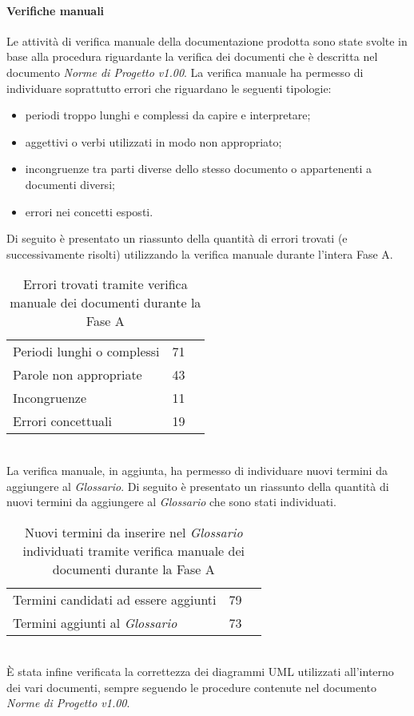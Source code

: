\documentclass[../PianoDiQualifica.tex]{subfiles}
\begin{document}
\begin{appendices}
			\paragraph{Verifiche manuali}
			Le attività di verifica manuale della documentazione prodotta sono state svolte in base alla procedura riguardante la verifica dei documenti che è descritta nel documento \textit{Norme di Progetto v1.00}. La verifica manuale ha permesso di individuare soprattutto errori che riguardano le seguenti tipologie:
			\begin{itemize}
				\item periodi troppo lunghi e complessi da capire e interpretare;
				\item aggettivi o verbi utilizzati in modo non appropriato;
				\item incongruenze tra parti diverse dello stesso documento o appartenenti a documenti diversi;
				\item errori nei concetti esposti.
			\end{itemize}
			Di seguito è presentato un riassunto della quantità di errori trovati (e successivamente risolti) utilizzando la verifica manuale durante l'intera Fase A.
\begin{table}[h]
		\centering
		\begin{tabular}{l * {2}{c}}
			\midrule
			Periodi lunghi o complessi &	71 \\
			Parole non appropriate & 43 \\
			Incongruenze & 11 \\
			Errori concettuali & 19 \\
			\midrule
		\end{tabular}
		\caption{Errori trovati tramite verifica manuale dei documenti durante la Fase A}
		\label{tab:errori_manuale}
\end{table}
			\\La verifica manuale, in aggiunta, ha permesso di individuare nuovi termini da aggiungere al \textit{Glossario}. Di seguito è presentato un riassunto della quantità di nuovi termini da aggiungere al \textit{Glossario} che sono stati individuati.
\begin{table}[h]
		\centering
		\begin{tabular}{l * {2}{c}}
			\midrule
			Termini candidati ad essere aggiunti &	79 \\
			Termini aggiunti al \textit{Glossario} & 73 \\
			\midrule
		\end{tabular}
		\caption{Nuovi termini da inserire nel \textit{Glossario} individuati tramite verifica manuale dei documenti durante la Fase A}
		\label{tab:termini_glossario}
\end{table}	
			\\È stata infine verificata la correttezza dei diagrammi UML utilizzati all'interno dei vari documenti, sempre seguendo le procedure contenute nel documento \textit{Norme di Progetto v1.00}.

\end{appendices}
\end{document}

